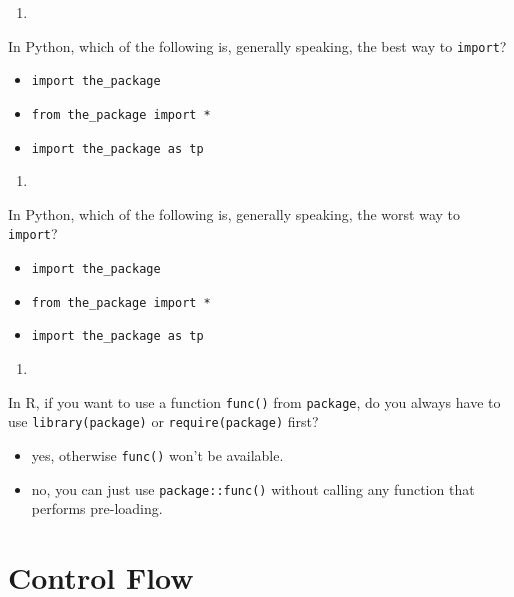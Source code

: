 \documentclass[
  12pt,
  krantz2]{krantz}
\providecommand{\tightlist}{%
  \setlength{\itemsep}{0pt}\setlength{\parskip}{0pt}}
\begin{document}
\begin{enumerate}
\def\labelenumi{\arabic{enumi}.}
\setcounter{enumi}{2}
\tightlist
\item
\end{enumerate}

In Python, which of the following is, generally speaking, the best way to \texttt{import}?

\begin{itemize}
\tightlist
\item
  \texttt{import\ the\_package}
\item
  \texttt{from\ the\_package\ import\ *}
\item
  \texttt{import\ the\_package\ as\ tp}
\end{itemize}

\begin{enumerate}
\def\labelenumi{\arabic{enumi}.}
\setcounter{enumi}{3}
\tightlist
\item
\end{enumerate}

In Python, which of the following is, generally speaking, the worst way to \texttt{import}?

\begin{itemize}
\tightlist
\item
  \texttt{import\ the\_package}
\item
  \texttt{from\ the\_package\ import\ *}
\item
  \texttt{import\ the\_package\ as\ tp}
\end{itemize}

\begin{enumerate}
\def\labelenumi{\arabic{enumi}.}
\setcounter{enumi}{4}
\tightlist
\item
\end{enumerate}

In R, if you want to use a function \texttt{func()} from \texttt{package}, do you always have to use \texttt{library(package)} or \texttt{require(package)} first?

\begin{itemize}
\tightlist
\item
  yes, otherwise \texttt{func()} won't be available.
\item
  no, you can just use \texttt{package::func()} without calling any function that performs pre-loading.
\end{itemize}

\hypertarget{control-flow}{%
\chapter{Control Flow}\label{control-flow}}
\end{document}
